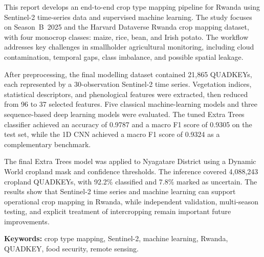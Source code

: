 \noindent
This report develops an end-to-end crop type mapping pipeline for Rwanda using
Sentinel-2 time-series data and supervised machine learning. The study focuses
on Season~B~2025 and the Harvard Dataverse Rwanda crop mapping dataset, with
four monocrop classes: maize, rice, bean, and Irish potato. The workflow
addresses key challenges in smallholder agricultural monitoring, including
cloud contamination, temporal gaps, class imbalance, and possible spatial
leakage.

After preprocessing, the final modelling dataset contained 21,865 QUADKEYs,
each represented by a 30-observation Sentinel-2 time series. Vegetation
indices, statistical descriptors, and phenological features were extracted,
then reduced from 96 to 37 selected features. Five classical machine-learning
models and three sequence-based deep learning models were evaluated. The tuned
Extra Trees classifier achieved an accuracy of 0.9787 and a macro F1 score of
0.9305 on the test set, while the 1D CNN achieved a macro F1 score of 0.9324
as a complementary benchmark.

The final Extra Trees model was applied to Nyagatare District using a Dynamic
World cropland mask and confidence thresholds. The inference covered
4,088,243 cropland QUADKEYs, with 92.2\% classified and 7.8\% marked as
uncertain. The results show that Sentinel-2 time series and machine learning
can support operational crop mapping in Rwanda, while independent validation,
multi-season testing, and explicit treatment of intercropping remain important
future improvements.

\medskip
\noindent\textbf{Keywords:} crop type mapping, Sentinel-2, machine learning,
Rwanda, QUADKEY, food security, remote sensing.
